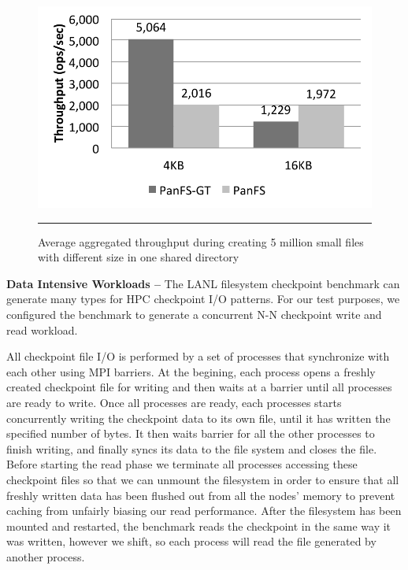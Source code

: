 \begin{figure}[t]  %
\centerline{\includegraphics[scale=0.7]{./figs/small_file_creates}}
\vspace{10pt}
\caption{\footnotesize
\textsf{Average aggregated throughput during creating 5 million small files
with different size in one shared directory}
}
\hrule
\label{graph:smallfiles}
\end{figure}       %



\textbf{Data Intensive Workloads -- }
The LANL filesystem checkpoint benchmark can
generate many types for HPC checkpoint I/O patterns.
For our test purposes, we configured the benchmark to generate
a concurrent N-N checkpoint write and read workload.

All checkpoint file I/O is performed by a set of processes
that synchronize with each other using MPI barriers.
At the begining, each process opens a freshly created checkpoint file
for writing and then waits at a barrier until all processes are ready to write.
Once all processes are ready, each processes starts
concurrently writing the checkpoint data to its own file,
until it has written the specified number of bytes.
It then waits barrier for all the other processes to finish writing,
and finally syncs its data to the file system and closes the file.
Before starting the read phase we terminate all processes
accessing these checkpoint files so that
we can unmount the filesystem in order to ensure that
all freshly written data has been flushed out from all the nodes' memory
to prevent caching from unfairly biasing our read performance.
After the filesystem has been mounted and restarted,
the benchmark reads the checkpoint in the same way it was written,
however we shift, so each process will read
the file generated by another process.

